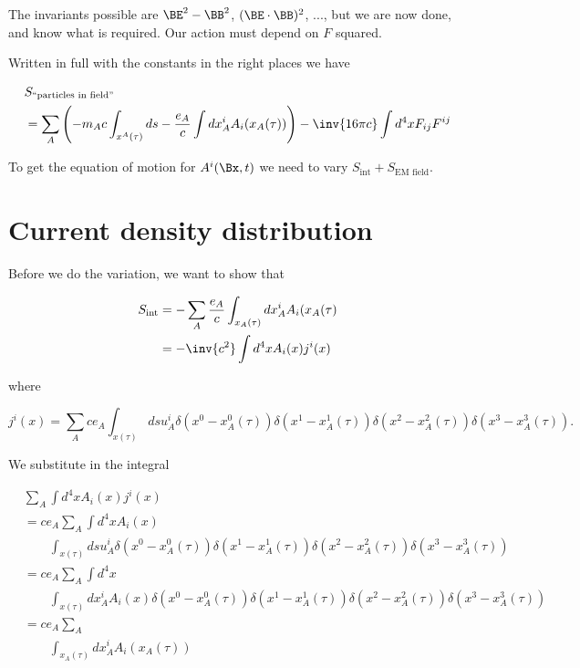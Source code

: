 The invariants possible are \(\BE^2 - \BB^2\), \((\BE \cdot \BB)^2\), ..., but we are now done, and know what is required.  Our action must depend on \(F\) squared.

Written in full with the constants in the right places we have

\begin{equation}\label{eqn:relativisticElectrodynamicsL12b:370}
\begin{aligned}
&S_{\text{``particles in field''}} \\
&= \sum_A \left( -m_A c \int_{x^A(\tau)} ds - \frac{e_A}{c} \int dx^i_A A_i(x_A(\tau))
\right)
- \inv{16 \pi c} \int d^4 x F_{ij} F^{ij}
\end{aligned}
\end{equation}

To get the equation of motion for \(A^i(\Bx, t)\) we need to vary \(S_{\text{int}} + S_{\text{EM field}}\).

\section{Current density distribution}

Before we do the variation, we want to show that

\begin{equation}\label{eqn:relativisticElectrodynamicsL12b:590}
\begin{aligned}
S_{\text{int}} 
&= -\sum_A \frac{e_A}{c} \int_{x_A(\tau)} dx^i_A A_i(x_A(\tau) \\
&= -\inv{c^2} \int d^4 x A_i(x) j^i(x) 
\end{aligned}
\end{equation}

where

\begin{equation}\label{eqn:relativisticElectrodynamicsL12b:390}
j^i(x) = 
\sum_A c e_A \int_{x(\tau)}
ds u^i_A 
\delta(x^0 - x^0_A(\tau))
\delta(x^1 - x^1_A(\tau))
\delta(x^2 - x^2_A(\tau))
\delta(x^3 - x^3_A(\tau)).
\end{equation}

We substitute in the integral

\begin{equation}\label{eqn:relativisticElectrodynamicsL12b:610}
\begin{aligned}
&\sum_A \int d^4 x A_i(x) j^i(x) \\
&= 
c e_A \sum_A \int d^4 x A_i(x) \\
&\qquad \int_{x(\tau)}
ds u^i_A 
\delta(x^0 - x^0_A(\tau))
\delta(x^1 - x^1_A(\tau))
\delta(x^2 - x^2_A(\tau))
\delta(x^3 - x^3_A(\tau)) \\
&= 
c e_A \sum_A 
\int d^4 x \\
&\qquad \int_{x(\tau)}
dx^i_A 
A_i(x) 
\delta(x^0 - x^0_A(\tau))
\delta(x^1 - x^1_A(\tau))
\delta(x^2 - x^2_A(\tau))
\delta(x^3 - x^3_A(\tau)) \\
&=
c e_A \sum_A \\
&\qquad \int_{x_A(\tau)}
dx^i_A 
A_i(x_A(\tau)) 
\end{aligned}
\end{equation}

